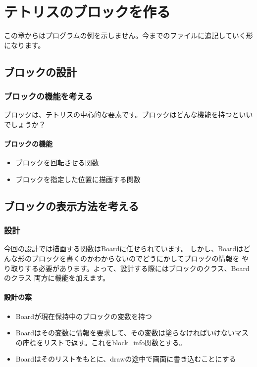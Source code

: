 \chapter{テトリスのブロックを作る}
この章からはプログラムの例を示しません。今までのファイルに追記していく形になります。
\section{ブロックの設計}
\subsection{ブロックの機能を考える}
ブロックは、テトリスの中心的な要素です。ブロックはどんな機能を持つといいでしょうか？
\subsubsection{ブロックの機能}
\begin{itemize}
  \item ブロックを回転させる関数
  \item ブロックを指定した位置に描画する関数
\end{itemize}

\section{ブロックの表示方法を考える}
\subsection{設計}
今回の設計では描画する関数はBoardに任せられています。
しかし、Boardはどんな形のブロックを書くのかわからないのでどうにかしてブロックの情報を
やり取りする必要があります。よって、設計する際にはブロックのクラス、Boardのクラス
両方に機能を加えます。
\subsubsection{設計の案}
\begin{itemize}
  \item Boardが現在保持中のブロックの変数を持つ
  \item Boardはその変数に情報を要求して、その変数は塗らなければいけないマスの座標をリストで返す。これをblock\_info関数とする。
  \item Boardはそのリストをもとに、drawの途中で画面に書き込むことにする
\end{itemize}

